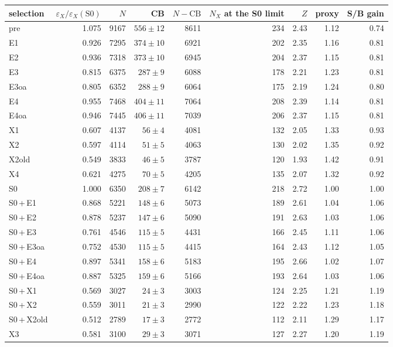 \begin{tabular}{@{}l r r r r r r r r@{}}
\toprule
selection & $\varepsilon_X/\varepsilon_X(\mathrm{S0})$ & $N$ & CB & $N-\mathrm{CB}$ & $N_X$ at the S0 limit & $Z$ & proxy & S/B gain \\
\midrule
pre & 1.075 & 9167 & $556\pm12$ & 8611 & 234 & 2.43 & 1.12 & 0.74 \\
E1 & 0.926 & 7295 & $374\pm10$ & 6921 & 202 & 2.35 & 1.16 & 0.81 \\
E2 & 0.936 & 7318 & $373\pm10$ & 6945 & 204 & 2.37 & 1.15 & 0.81 \\
E3 & 0.815 & 6375 & $287\pm9$ & 6088 & 178 & 2.21 & 1.23 & 0.81 \\
E3oa & 0.805 & 6352 & $288\pm9$ & 6064 & 175 & 2.19 & 1.24 & 0.80 \\
E4 & 0.955 & 7468 & $404\pm11$ & 7064 & 208 & 2.39 & 1.14 & 0.81 \\
E4oa & 0.946 & 7445 & $406\pm11$ & 7039 & 206 & 2.37 & 1.15 & 0.81 \\
X1 & 0.607 & 4137 & $56\pm4$ & 4081 & 132 & 2.05 & 1.33 & 0.93 \\
X2 & 0.597 & 4114 & $51\pm5$ & 4063 & 130 & 2.02 & 1.35 & 0.92 \\
X2old & 0.549 & 3833 & $46\pm5$ & 3787 & 120 & 1.93 & 1.42 & 0.91 \\
X4 & 0.621 & 4275 & $70\pm5$ & 4205 & 135 & 2.07 & 1.32 & 0.92 \\
\midrule
S0 & 1.000 & 6350 & $208\pm7$ & 6142 & 218 & 2.72 & 1.00 & 1.00 \\
S0\,+\,E1 & 0.868 & 5221 & $148\pm6$ & 5073 & 189 & 2.61 & 1.04 & 1.06 \\
S0\,+\,E2 & 0.878 & 5237 & $147\pm6$ & 5090 & 191 & 2.63 & 1.03 & 1.06 \\
S0\,+\,E3 & 0.761 & 4546 & $115\pm5$ & 4431 & 166 & 2.45 & 1.11 & 1.06 \\
S0\,+\,E3oa & 0.752 & 4530 & $115\pm5$ & 4415 & 164 & 2.43 & 1.12 & 1.05 \\
S0\,+\,E4 & 0.897 & 5341 & $158\pm6$ & 5183 & 195 & 2.66 & 1.02 & 1.07 \\
S0\,+\,E4oa & 0.887 & 5325 & $159\pm6$ & 5166 & 193 & 2.64 & 1.03 & 1.06 \\
S0\,+\,X1 & 0.569 & 3027 & $24\pm3$ & 3003 & 124 & 2.25 & 1.21 & 1.19 \\
S0\,+\,X2 & 0.559 & 3011 & $21\pm3$ & 2990 & 122 & 2.22 & 1.23 & 1.18 \\
S0\,+\,X2old & 0.512 & 2789 & $17\pm3$ & 2772 & 112 & 2.11 & 1.29 & 1.17 \\
X3 & 0.581 & 3100 & $29\pm3$ & 3071 & 127 & 2.27 & 1.20 & 1.19 \\
\bottomrule
\end{tabular}
